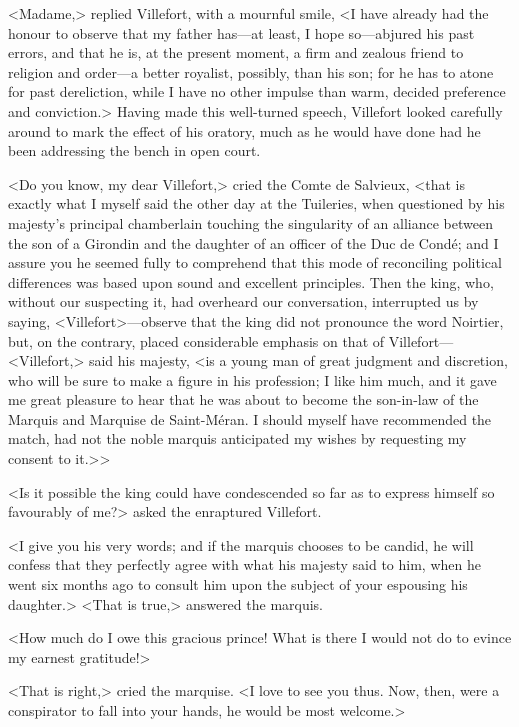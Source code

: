  <Madame,> replied Villefort, with a mournful smile, <I have already had the honour to observe that my father has—at least, I hope so—abjured his past errors, and that he is, at the present moment, a firm and zealous friend to religion and order—a better royalist, possibly, than his son; for he has to atone for past dereliction, while I have no other impulse than warm, decided preference and conviction.> Having made this well-turned speech, Villefort looked carefully around to mark the effect of his oratory, much as he would have done had he been addressing the bench in open court. 

 <Do you know, my dear Villefort,> cried the Comte de Salvieux, <that is exactly what I myself said the other day at the Tuileries, when questioned by his majesty's principal chamberlain touching the singularity of an alliance between the son of a Girondin and the daughter of an officer of the Duc de Condé; and I assure you he seemed fully to comprehend that this mode of reconciling political differences was based upon sound and excellent principles. Then the king, who, without our suspecting it, had overheard our conversation, interrupted us by saying, <Villefort>—observe that the king did not pronounce the word Noirtier, but, on the contrary, placed considerable emphasis on that of Villefort—<Villefort,> said his majesty, <is a young man of great judgment and discretion, who will be sure to make a figure in his profession; I like him much, and it gave me great pleasure to hear that he was about to become the son-in-law of the Marquis and Marquise de Saint-Méran. I should myself have recommended the match, had not the noble marquis anticipated my wishes by requesting my consent to it.>> 

 <Is it possible the king could have condescended so far as to express himself so favourably of me?> asked the enraptured Villefort. 

 <I give you his very words; and if the marquis chooses to be candid, he will confess that they perfectly agree with what his majesty said to him, when he went six months ago to consult him upon the subject of your espousing his daughter.>  <That is true,> answered the marquis. 

 <How much do I owe this gracious prince! What is there I would not do to evince my earnest gratitude!> 

 <That is right,> cried the marquise. <I love to see you thus. Now, then, were a conspirator to fall into your hands, he would be most welcome.> 

